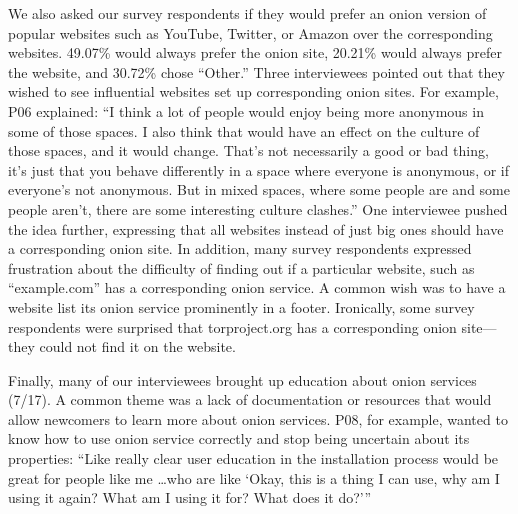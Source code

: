 We also asked our survey respondents if they would prefer an onion version of
popular websites such as YouTube, Twitter, or Amazon over the corresponding
websites.  49.07\% would always prefer the onion site, 20.21\% would always
prefer the website, and 30.72\% chose ``Other.''  Three interviewees pointed out
that they wished to see influential websites set up corresponding onion sites.
For example, P06 explained: ``I think a lot of people would enjoy being more
anonymous in some of those spaces.  I also think that would have an effect on
the culture of those spaces, and it would change.  That's not necessarily a good
or bad thing, it's just that you behave differently in a space where everyone is
anonymous, or if everyone's not anonymous.  But in mixed spaces, where some
people are and some people aren't, there are some interesting culture clashes.''
One interviewee pushed the idea further, expressing that all websites instead of
just big ones should have a corresponding onion site.  In addition, many survey
respondents expressed frustration about the difficulty of finding out if a
particular website, such as ``example.com'' has a corresponding onion service.
A common wish was to have a website list its onion service prominently in a
footer.  Ironically, some survey respondents were surprised that torproject.org
has a corresponding onion site---they could not find it on the website.


Finally, many of our interviewees brought up education about onion services
(7/17).  A common theme was a lack of documentation or resources that would
allow newcomers to learn more about onion services.  P08, for example, wanted to
know how to use onion service correctly and stop being uncertain about its
properties: ``Like really clear user education in the installation process would
be great for people like me \ldots who are like `Okay, this is a thing I can
use, why am I using it again? What am I using it for? What does it do?'''


